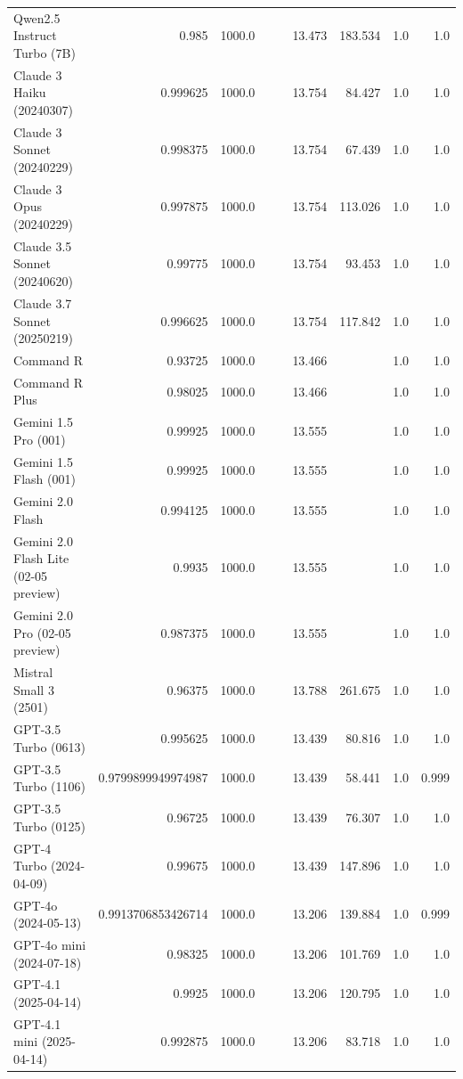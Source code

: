 \begin{table}[htp]
{\begin{tabular}{lrrrrrrrr}
Qwen2.5 Instruct Turbo (7B) & 0.985 & 1000.0 &  &  & 13.473 & 183.534 & 1.0 & 1.0 \\
Claude 3 Haiku (20240307) & 0.999625 & 1000.0 &  &  & 13.754 & 84.427 & 1.0 & 1.0 \\
Claude 3 Sonnet (20240229) & 0.998375 & 1000.0 &  &  & 13.754 & 67.439 & 1.0 & 1.0 \\
Claude 3 Opus (20240229) & 0.997875 & 1000.0 &  &  & 13.754 & 113.026 & 1.0 & 1.0 \\
Claude 3.5 Sonnet (20240620) & 0.99775 & 1000.0 &  &  & 13.754 & 93.453 & 1.0 & 1.0 \\
Claude 3.7 Sonnet (20250219) & 0.996625 & 1000.0 &  &  & 13.754 & 117.842 & 1.0 & 1.0 \\
Command R & 0.93725 & 1000.0 &  &  & 13.466 &  & 1.0 & 1.0 \\
Command R Plus & 0.98025 & 1000.0 &  &  & 13.466 &  & 1.0 & 1.0 \\
Gemini 1.5 Pro (001) & 0.99925 & 1000.0 &  &  & 13.555 &  & 1.0 & 1.0 \\
Gemini 1.5 Flash (001) & 0.99925 & 1000.0 &  &  & 13.555 &  & 1.0 & 1.0 \\
Gemini 2.0 Flash & 0.994125 & 1000.0 &  &  & 13.555 &  & 1.0 & 1.0 \\
Gemini 2.0 Flash Lite (02-05 preview) & 0.9935 & 1000.0 &  &  & 13.555 &  & 1.0 & 1.0 \\
Gemini 2.0 Pro (02-05 preview) & 0.987375 & 1000.0 &  &  & 13.555 &  & 1.0 & 1.0 \\
Mistral Small 3 (2501) & 0.96375 & 1000.0 &  &  & 13.788 & 261.675 & 1.0 & 1.0 \\
GPT-3.5 Turbo (0613) & 0.995625 & 1000.0 &  &  & 13.439 & 80.816 & 1.0 & 1.0 \\
GPT-3.5 Turbo (1106) & 0.9799899949974987 & 1000.0 &  &  & 13.439 & 58.441 & 1.0 & 0.999 \\
GPT-3.5 Turbo (0125) & 0.96725 & 1000.0 &  &  & 13.439 & 76.307 & 1.0 & 1.0 \\
GPT-4 Turbo (2024-04-09) & 0.99675 & 1000.0 &  &  & 13.439 & 147.896 & 1.0 & 1.0 \\
GPT-4o (2024-05-13) & 0.9913706853426714 & 1000.0 &  &  & 13.206 & 139.884 & 1.0 & 0.999 \\
GPT-4o mini (2024-07-18) & 0.98325 & 1000.0 &  &  & 13.206 & 101.769 & 1.0 & 1.0 \\
GPT-4.1 (2025-04-14) & 0.9925 & 1000.0 &  &  & 13.206 & 120.795 & 1.0 & 1.0 \\
GPT-4.1 mini (2025-04-14) & 0.992875 & 1000.0 &  &  & 13.206 & 83.718 & 1.0 & 1.0 \\

\end{tabular}}
\end{table}
